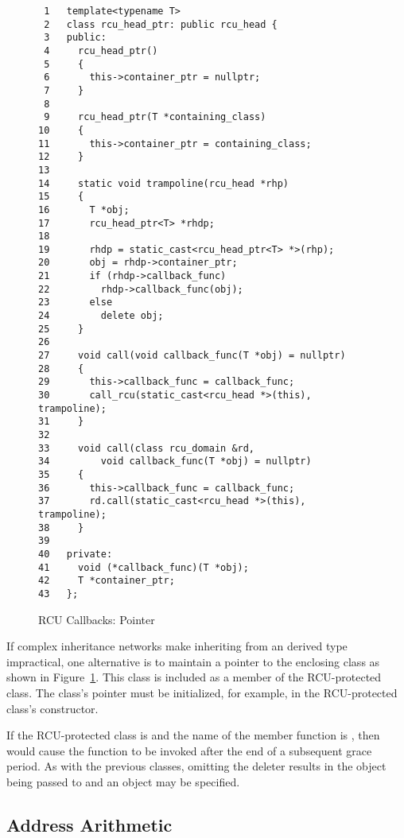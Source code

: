 \documentclass[letterpaper,twocolumn,10pt]{article}
\begin{document}
\begin{figure}[tbp]
{ \scriptsize
\begin{verbatim}
 1   template<typename T>
 2   class rcu_head_ptr: public rcu_head {
 3   public:
 4     rcu_head_ptr()
 5     {
 6       this->container_ptr = nullptr;
 7     }
 8
 9     rcu_head_ptr(T *containing_class)
10     {
11       this->container_ptr = containing_class;
12     }
13
14     static void trampoline(rcu_head *rhp)
15     {
16       T *obj;
17       rcu_head_ptr<T> *rhdp;
18
19       rhdp = static_cast<rcu_head_ptr<T> *>(rhp);
20       obj = rhdp->container_ptr;
21       if (rhdp->callback_func)
22         rhdp->callback_func(obj);
23       else
24         delete obj;
25     }
26
27     void call(void callback_func(T *obj) = nullptr)
28     {
29       this->callback_func = callback_func;
30       call_rcu(static_cast<rcu_head *>(this), trampoline);
31     }
32
33     void call(class rcu_domain &rd,
34         void callback_func(T *obj) = nullptr)
35     {
36       this->callback_func = callback_func;
37       rd.call(static_cast<rcu_head *>(this), trampoline);
38     }
39
40   private:
41     void (*callback_func)(T *obj);
42     T *container_ptr;
43   };
\end{verbatim}
}
\caption{RCU Callbacks: Pointer}
\label{fig:RCU Callbacks: Pointer}
\end{figure}

If complex inheritance networks make inheriting from an
 derived type impractical, one alternative is
to maintain a pointer to the enclosing class as shown in
Figure~\ref{fig:RCU Callbacks: Pointer}.
This  class is included as a member of the RCU-protected
class.
The  class's pointer must be initialized, for example,
in the RCU-protected class's constructor.

If the RCU-protected class is  and the name of the
 member function is , then
 would cause the function  to be
invoked after the end of a subsequent grace period.
As with the previous classes, omitting the deleter results
in the object being passed to  and an 
object may be specified.

\subsection{Address Arithmetic}
\label{sec:Address Arithmetic}
\end{document}

